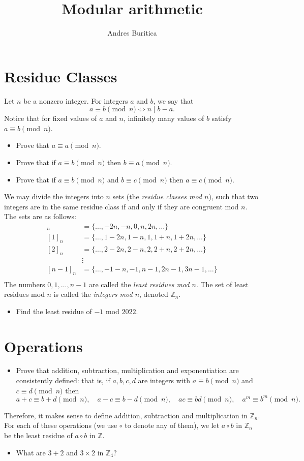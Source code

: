 \documentclass{article}
\title{Modular arithmetic}
\author{Andres Buritica}
\begin{document}
\maketitle
\section{Residue Classes}
  Let $n$ be a nonzero integer. For integers $a$ and $b$, we say that
  \[a\equiv b\pmod n\iff n\mid b-a.\]
  Notice that for fixed values of $a$ and $n$, infinitely many values of $b$
  satisfy $a\equiv b\pmod n$.
  \begin{itemize}
    \item Prove that $a\equiv a\pmod n$.
    \item Prove that if $a\equiv b\pmod n$ then $b\equiv a\pmod n$.
    \item Prove that if $a\equiv b\pmod n$ and $b\equiv c\pmod n$ then $a\equiv
      c\pmod n$.
  \end{itemize}
  We may divide the integers into $n$ sets (the \emph{residue classes mod $n$}),
  such that two integers are in the same residue class if and only if they are
  congruent mod $n$. The sets are as follows:
  \begin{align*}
    [0]_n&=\{\ldots,-2n,-n,0,n,2n,\ldots\} \\
    [1]_n&=\{\ldots,1-2n,1-n,1,1+n,1+2n,\ldots\} \\
    [2]_n&=\{\ldots,2-2n,2-n,2,2+n,2+2n,\ldots\} \\
         &\vdots \\
    [n-1]_n&=\{\ldots,-1-n,-1,n-1,2n-1,3n-1,\ldots\} \\
  \end{align*}
  The numbers $0,1,\ldots,n-1$ are called the \emph{least residues mod $n$}. The
  set of least residues mod $n$ is called the \emph{integers mod $n$}, denoted
  $\mathbb Z_n$.
  \begin{itemize}
    \item Find the least residue of $-1$ mod $2022$.
  \end{itemize}
  \newpage
\section{Operations}
  \begin{itemize}
    \item Prove that addition, subtraction, multiplication and exponentiation
      are consistently defined: that
      is, if $a,b,c,d$ are integers with $a\equiv b\pmod n$ and $c\equiv d\pmod
      n$ then \[a+c\equiv b+d\pmod n,\quad a-c\equiv b-d\pmod n,\quad ac\equiv
        bd\pmod n,\quad a^m\equiv b^m\pmod n.\]
  \end{itemize}
  Therefore, it makes sense to define addition, subtraction and multiplication
  in $\mathbb Z_n$. For each of these operations (we use $\circ$ to denote any
  of them), we let $a\circ b$ in $\mathbb Z_n$ be the least residue of $a\circ
  b$ in $\mathbb Z$.
  \begin{itemize}
    \item What are $3+2$ and $3\times 2$ in $\mathbb Z_4$?
  \end{itemize}
\end{document}
